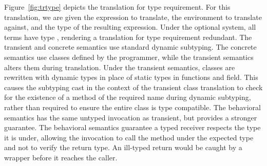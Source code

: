\documentclass[a4paper,USenglish]{tex/lipics-v2016}
\begin{document}
Figure~\ref{fig:trtype} depicts the translation for type requirement. For
this translation, we are given the expression to translate, the environment
to translate against, and the \kafka type of the resulting
expression. Under the optional system, all terms have type \any, rendering a
translation for type requirement redundant.
The transient and concrete semantics use standard dynamic subtyping.
The concrete semantics use classes defined by the programmer, while the
transient semantics alters them during translation. Under the transient
semantics, classes are rewritten with dynamic types in place of static types
in functions and field. This causes the subtyping cast in the context of the
transient class translation to check for the existence of a method of
the required name during dynamic subtyping, rather than required to ensure 
the entire class is type compatible.
The behavioral semantics has the same untyped invocation as transient, but 
provides a stronger guarantee. 
The behavioral semantics guarantee a typed receiver respects the type
it is under, allowing the invocation to call the method under the
expected type and not to verify the return type. An ill-typed return
would be caught by a wrapper before it reaches the caller.
\end{document}
